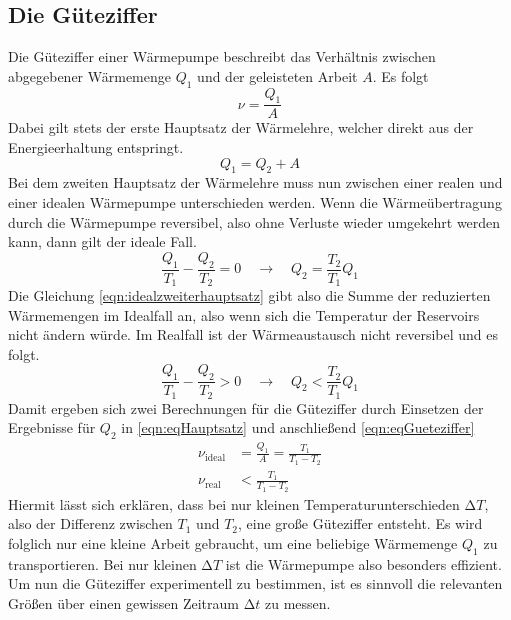 \subsection{Die Güteziffer}
\label{sec:Gueteziffer}
Die Güteziffer einer Wärmepumpe beschreibt das Verhältnis zwischen abgegebener Wärmemenge $Q_{1}$ und der geleisteten Arbeit $A$. Es folgt
\begin{equation}
\label{eqn:eqGueteziffer}
\nu = \frac{Q_{1}}{A}
\end{equation}
Dabei gilt stets der erste Hauptsatz der Wärmelehre, welcher direkt aus der Energieerhaltung entspringt.
\begin{equation}
\label{eqn:eqHauptsatz}
Q_{1} = Q_{2} + A
\end{equation}
Bei dem zweiten Hauptsatz der Wärmelehre muss nun zwischen einer realen und einer idealen Wärmepumpe unterschieden werden.
Wenn die Wärmeübertragung durch die Wärmepumpe reversibel, also ohne Verluste wieder umgekehrt werden kann, dann gilt der ideale Fall.
\begin{equation}
\label{eqn:idealzweiterhauptsatz}
\frac{Q_{1}}{T_{1}} - \frac{Q_{2}}{T_{2}} = 0 \quad \to \quad Q_{2} = \frac{T_{2}}{T_{1}} Q_{1}
\end{equation}
Die Gleichung \eqref{eqn:idealzweiterhauptsatz} gibt also die Summe der reduzierten Wärmemengen im Idealfall an, also wenn sich die Temperatur der Reservoirs nicht ändern würde.
Im Realfall ist der Wärmeaustausch nicht reversibel und es folgt.
\begin{equation}
\label{eqn:realzweiterhauptsatz}
\frac{Q_{1}}{T_{1}} - \frac{Q_{2}}{T_{2}} > 0 \quad \to \quad Q_{2} < \frac{T_{2}}{T_{1}} Q_{1}
\end{equation}
Damit ergeben sich zwei Berechnungen für die Güteziffer durch Einsetzen der Ergebnisse für $Q_{2}$ in \eqref{eqn:eqHauptsatz} und anschließend \eqref{eqn:eqGueteziffer}
\begin{align}
\nu_{\text{ideal}} &= \frac{Q_{1}}{A} = \frac{T_{1}}{T_{1}-T_{2}} \label{eqn:idealgueteziffer}\\
\nu_{\text{real}} &< \frac{T_{1}}{T_{1}-T_{2}} \label{eqn:realgueteziffer}
\end{align}
Hiermit lässt sich erklären, dass bei nur kleinen Temperaturunterschieden $\increment T$, also der Differenz zwischen $T_{1}$ und $T_{2}$, eine große Güteziffer
entsteht. Es wird folglich nur eine kleine Arbeit gebraucht, um eine beliebige Wärmemenge $Q_{1}$ zu transportieren. Bei nur kleinen $\increment T$ ist die Wärmepumpe also 
besonders effizient.
Um nun die Güteziffer experimentell zu bestimmen, ist es sinnvoll die relevanten Größen über einen gewissen Zeitraum $\increment t$ zu messen.
